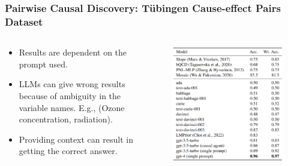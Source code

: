 \documentclass{beamer}
\begin{document}
\begin{frame}
	\frametitle{Pairwise Causal Discovery: T\"{u}bingen Cause-effect Pairs Dataset}
	\begin{columns}
		\begin{column}{0.5 \textwidth}
			\begin{itemize}
				\item Results are dependent on the prompt used.
				\item LLMs can give wrong results because of ambiguity in the variable names. E.g., (Ozone concentration, radiation).
				\item Providing context can result in getting the correct answer.
			\end{itemize}
		\end{column}
		\begin{column}{0.5 \textwidth}
			\begin{figure}
				\includegraphics[scale=0.2]{imgs/table2.png}
			\end{figure}
		\end{column}
	\end{columns}
\end{frame}
\end{document}
